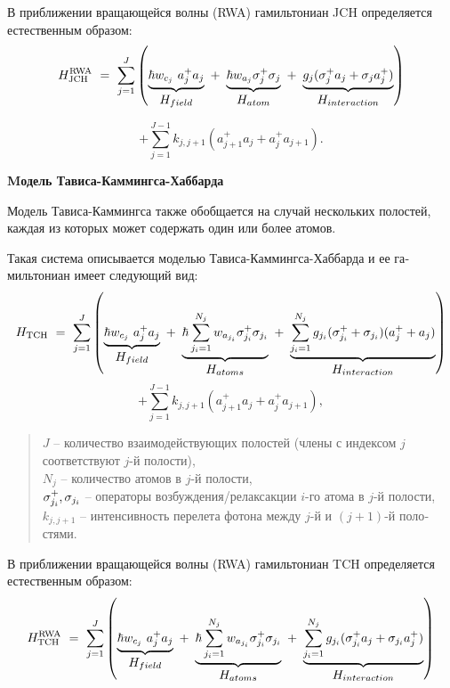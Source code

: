 В приближении вращающейся волны (RWA) \cite{ozhigov_qq,rwa_rabi_1,rwa_rabi_2} гамильтониан JCH определяется естественным образом:
\[
H_{\text{JCH}}^{\text{RWA}}~=~\sum_{j=1}^J \left(\underbrace{\hbar w_{c_j}\ a_j^+a_j}_{\textstyle H_{field}}~+~\underbrace{\hbar w_{a_j}{\sigma_{j}^+\sigma_{j}}}_{\textstyle H_{atom}}~+~\underbrace{g_j{(\sigma_{j}^+a_j+\sigma_{j}a_j^+)}}_{\textstyle H_{interaction}} \right)
\]

\begin{equation}
	+\sum_{j=1}^{J-1}{k_{j,j+1}\left(a_{j+1}^+a_j+a_{j}^+a_{j+1}\right)}.
\end{equation}

\clearpage
\indent\textbf{Mодель Тависа-Каммингса-Хаббарда}

Модель Тависа-Каммингса также обобщается на случай нескольких поло­стей, каждая из которых может содержать один или более атомов.
\begin{figure}[h!]
	\noindent{}
\end{figure}

Такая система описывается моделью Тависа-Каммингса-Хаббарда \cite{tch_photon_blockade,tch_transfer,tch_quality} и ее га­мильтониан имеет следующий вид:
\[
H_{\text{TCH}}~=~\sum_{j=1}^J \left(\underbrace{\hbar w_{c_{j}}\ a_j^+a_{j}}_{\textstyle H_{field}}~+~\underbrace{\hbar\sum_{j_{i}=1}^{N_{j}}{w_{a_{j_i}}\sigma_{j_i}^+\sigma_{j_i}}}_{\textstyle H_{atoms}}~+~\underbrace{\sum_{j_{i}=1}^{N_{j}}g_{j_i}{(\sigma_{j_i}^{+}+\sigma_{j_i})(a_{j}^{+}+a_{j})}}_{\textstyle H_{interaction}} \right)
\]
\begin{equation}
	+\sum_{j=1}^{J-1}{k_{j,j+1}\left(a_{j+1}^+a_j+a_{j}^+a_{j+1}\right)},
\end{equation}
\begin{quote}
	$J$ -- количество взаимодействующих полостей (члены с индексом $j$ соответствуют $j$-й полости),\\
	$N_{j}$ -- количество атомов в $j$-й полости,\\
	$\sigma_{j_i}^{+},\sigma_{j_i}$ -- операторы возбуждения/релаксакции $i$-го атома в $j$-й полости,\\
	$k_{j,j+1}$ -- интенсивность перелета фотона между $j$-й и $(j+1)$-й поло­стями.
\end{quote}

В приближении вращающейся волны (RWA) \cite{ozhigov_qq,rwa_rabi_1,rwa_rabi_2} гамильтониан TCH определяется естественным образом:
\[
H_{\text{TCH}}^{\text{RWA}}~=~\sum_{j=1}^J \left(\underbrace{\hbar w_{c_j}\ a_j^+a_j}_{\textstyle H_{field}}~+~\underbrace{\hbar\sum_{j_{i}=1}^{N_{j}}{w_{a_{j_i}}\sigma_{j_i}^+\sigma_{j_i}}}_{\textstyle H_{atoms}}~+~\underbrace{\sum_{j_{i}=1}^{N_{j}}g_{j_i}{(\sigma_{j_i}^+a_j+\sigma_{j_i}a_j^+)}}_{\textstyle H_{interaction}} \right)
\]

